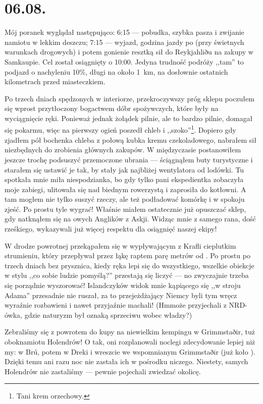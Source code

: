 \chapter*{06.08.}

Mój poranek wyglądał następująco: 6:15 --- pobudka, szybka pasza i zwijanie namiotu w lekkim deszczu; 7:15 --- wyjazd, godzina jazdy po  (przy świetnych warunkach drogowych) i potem gonienie resztką sił do Reykjahliðu na zakupy w Samkaupie. Cel został osiągnięty o 10:00. Jedyna trudność podróży ,,tam'' to podjazd o nachyleniu 10\%, długi na około 1~km, na dosłownie ostatnich kilometrach przed miasteczkiem.

Po trzech dniach spędzonych w interiorze, przekroczywszy próg sklepu poczułem się wprost przytłoczony bogactwem dóbr spożywczych, które były na wyciągnięcie ręki. Ponieważ jednak żołądek pilnie, ale to bardzo pilnie, domagał się pokarmu, więc na pierwszy ogień poszedł chleb i ,,szoko''\footnote{Tani krem orzechowy.}. Dopiero gdy zjadłem pół bochenka chleba z połową kubka kremu czekoladowego, nabrałem sił niezbędnych do zrobienia głównych zakupów. W międzyczasie postanowiłem jeszcze trochę podsuszyć przemoczone ubrania --- ściągnąłem buty turystyczne i starałem się ustawić je tak, by stały jak najbliżej wentylatora od lodówki. Tu spotkała mnie miła niespodzianka, bo gdy tylko pani ekspedientka zobaczyła moje zabiegi, ulitowała się nad biednym rowerzystą i zaprosiła do kotłowni. A tam mogłem nie tylko suszyć rzeczy, ale też podładować komórkę i w spokoju zjeść. Po prostu tyle wygrać! Właśnie miałem ostatecznie już opuszczać sklep, gdy natknąłem się na owych Anglików z Askji. Widząc mnie z samego rana, dość rześkiego, wykazywali już więcej respektu dla osiągnięć naszej ekipy!

W drodze powrotnej przekąpałem się w wypływającym z Krafli cieplutkim strumieniu, który przepływał przez łąkę raptem parę metrów od . Po prostu po trzech dniach bez prysznica, kiedy ręka lepi się do wszystkiego, wszelkie obiekcje w stylu ,,co sobie ludzie pomyślą?'' przestają się liczyć --- no zwyczajnie trzeba się porządnie wyszorować! Islandczyków widok mnie kąpiącego się ,,w stroju Adama'' przesadnie nie ruszał, za to przejeżdżający Niemcy byli tym wręcz wyraźnie rozbawieni i nawet przyjaźnie machali! (Hm\textellipsis może przyjechali z NRD-ówka, gdzie naturyzm był oznaką sprzeciwu wobec władzy?)

Zebraliśmy się z powrotem do kupy na niewielkim kempingu w Grimmstaðir, tuż obok\textellipsis namiotu Holendrów! O tak, oni rozplanowali noclegi zdecydowanie lepiej niż my: w Brú, potem w Dreki i wreszcie we wspomnianym Grimmstaðir (już koło ). Dzięki temu ani razu noc nie zastała ich w pośrodku niczego\textellipsis. Niestety, samych Holendrów nie zastaliśmy --- pewnie pojechali zwiedzać okolicę.

